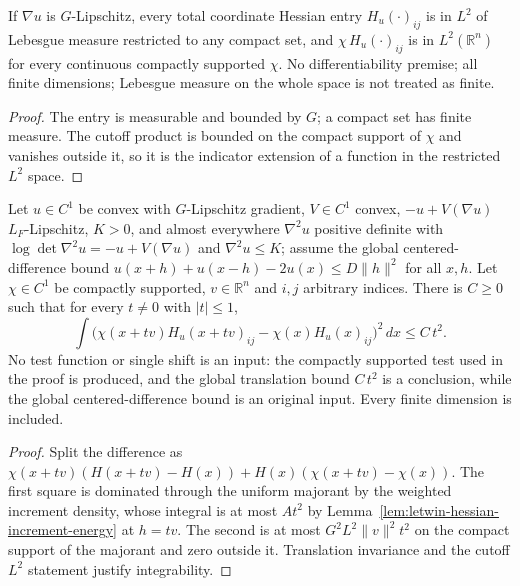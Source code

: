 \begin{lemma}
  \label{lem:hessian-entry-local-l2}
  \leanok
  If $\nabla u$ is $G$-Lipschitz, every total coordinate Hessian entry $H_u(\cdot)_{ij}$ is in $L^2$ of Lebesgue measure
  restricted to any compact set, and $\chi\,H_u(\cdot)_{ij}$ is in $L^2(\mathbb R^n)$ for every continuous compactly supported
  $\chi$. No differentiability premise; all finite dimensions; Lebesgue measure on the whole space is not treated as finite.
\end{lemma}
\begin{proof}
  \leanok
  The entry is measurable and bounded by $G$; a compact set has finite measure. The cutoff product is bounded on the compact
  support of $\chi$ and vanishes outside it, so it is the indicator extension of a function in the restricted $L^2$ space.
\end{proof}

\begin{lemma}
  \label{lem:letwin-cutoff-hessian-difference-energy}
  \leanok
  Let $u\in C^1$ be convex with $G$-Lipschitz gradient, $V\in C^1$ convex, $-u+V(\nabla u)$ $L_F$-Lipschitz, $K>0$, and almost
  everywhere $\nabla^2u$ positive definite with $\log\det\nabla^2u=-u+V(\nabla u)$ and $\nabla^2u\le K$; assume the global
  centered-difference bound $u(x+h)+u(x-h)-2u(x)\le D\|h\|^2$ for all $x,h$. Let $\chi\in C^1$ be compactly supported,
  $v\in\mathbb R^n$ and $i,j$ arbitrary indices. There is $C\ge0$ such that for every $t\ne0$ with $|t|\le1$,
  \[
    \int\bigl(\chi(x+tv)H_u(x+tv)_{ij}-\chi(x)H_u(x)_{ij}\bigr)^2\,dx\le C\,t^2 .
  \]
  No test function or single shift is an input: the compactly supported test used in the proof is produced, and the global
  translation bound $C\,t^2$ is a conclusion, while the global centered-difference bound is an original input. Every finite
  dimension is included.
\end{lemma}
\begin{proof}
  \leanok
  Split the difference as $\chi(x+tv)(H(x+tv)-H(x))+H(x)(\chi(x+tv)-\chi(x))$. The first square is dominated through the uniform
  majorant by the weighted increment density, whose integral is at most $A t^2$ by Lemma~\ref{lem:letwin-hessian-increment-energy}
  at $h=tv$. The second is at most $G^2L^2\|v\|^2t^2$ on the compact support of the majorant and zero outside it. Translation
  invariance and the cutoff $L^2$ statement justify integrability.
\end{proof}

